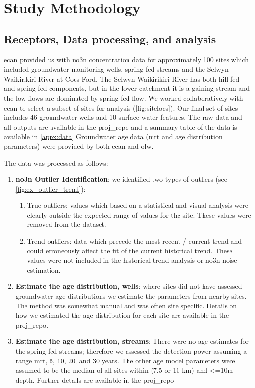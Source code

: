 \section[Methods]{Study Methodology}   \label{sec:methods}
\subsection[Data Processing]{Receptors, Data processing, and analysis} \label{sec:data}

\gls{ecan} provided us with \gls{no3n} concentration data for approximately 100 sites which included groundwater monitoring wells, spring fed streams and the Selwyn Waikirikiri River at Coes Ford. The Selwyn Waikirikiri River has both hill fed and spring fed components, but in the lower catchment it is a gaining stream and the low flows are dominated by spring fed flow. We worked collaboratively with \gls{ecan} to select a subset of sites for analysis (\autoref{fig:sitelocs}). Our final set of sites includes 46 groundwater wells and 10 surface water features. The raw data and all outputs are available in the \gls{proj_repo} and a summary table of the data is available in \autoref{appx:data} Groundwater age data (\gls{mrt} and age distribution parameters) were provided by both \gls{ecan} and \gls{olw}.

The data was processed as follows:
\begin{enumerate}
    \item \textbf{\gls{no3n} Outlier Identification}: we identified two types of outliers (see \autoref{fig:ex_outlier_trend}):
    \begin{enumerate}
        \item  True outliers: values which based on a statistical and visual analysis were clearly outside the expected range of values for the site. These values were removed from the dataset.
        \item Trend outliers: data which precede the most recent / current trend and could erroneously affect the fit of the current historical trend. These values were not included in the historical trend analysis or \gls{no3n} noise estimation.
    \end{enumerate}
    \item \textbf{Estimate the age distribution, wells}: where sites did not have assessed groundwater age distributions we estimate the parameters from nearby sites. The method was somewhat manual and was often site specific. Details on how we estimated the age distribution for each site are available in the \gls{proj_repo}.
    \item \textbf{Estimate the age distribution, streams}: There were no age estimates for the spring fed streams; therefore we assessed the detection power assuming a range \gls{mrt}, 5, 10, 20, and 30 years. The other age model parameters were assumed to be the median of all sites within (7.5 or 10 km) and <=10m depth. Further details are available in the \gls{proj_repo}
\end{enumerate}

